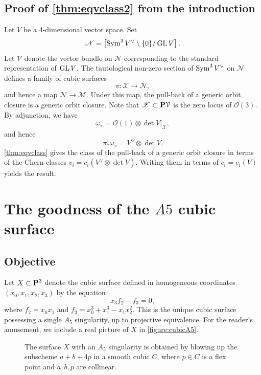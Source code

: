 \documentclass[12pt,reqno]{amsart}
\renewcommand{\to}{{\longrightarrow}}
\numberwithin{equation}{section}
\renewcommand{\O}{\mathcal O}
\begin{document}
\subsection{Proof of \texorpdfstring{\autoref{thm:eqvclass2}}{second theorem} from the introduction}\label{proof:eqvclass2}
Let $V$ be a 4-dimensional vector space.
Set
\[\mathscr N = \left[ \Sym^3V^\vee \setminus \{0\} / \GL V \right]. \]
Let $\mathcal V$ denote the vector bundle on $\mathscr N$ corresponding to the standard representation of $\GL V$.
The tautological non-zero section of $\Sym^3V^\vee$ on $\mathscr N$ defines a family of cubic surfaces
\[ \pi \colon \mathscr X \to \mathscr N,\]
and hence a map $\mathscr N \to \mathscr M$.
Under this map, the pull-back of a generic orbit closure is a generic orbit closure.
Note that $\mathscr X \subset \P \mathcal V$ is the zero locus of $\O(3)$.
By adjunction, we have
\[ \omega_\pi = \O(1) \otimes \det V |_{\mathscr X},\]
and hence
\[ \pi_* \omega_\pi = V^\vee \otimes \det V.\]
\autoref{thm:eqvclass} gives the class of the pull-back of a generic orbit closure in terms of the Chern classes $v_i = c_i(V^\vee \otimes \det V)$.
Writing them in terms of $c_i = c_i(V)$ yields the result.

\appendix



\section{The goodness of the $A5$ cubic surface}
\label{sec:goodnessA5}

\subsection{Objective}
Let $X \subset \P^{3}$ denote the cubic surface defined in homogeneous
coordinates $\left(x_{0}, x_{1}, x_{2}, x_{3}\right)$ by the equation
\[x_{3}f_{2} - f_{3} = 0,\] where $f_{2} = x_{0}x_{1}$ and
$f_{3} = x_{0}^3 + x_{1}^{3}-x_{1}x_{2}^{2}$.  This is the unique
cubic surface possessing a single $A_5$ singularity, up to projective
equivalence.  For the reader's amusement, we include a real picture of
$X$ in \autoref{figure:cubicA5}.

\begin{figure}
  \centering
  
  \caption{The surface $X$ with an $A_5$ singularity is obtained by blowing up the subscheme $a+b+4p$ in a smooth cubic $C$, where $p \in C$ is a flex point and $a, b, p$ are collinear.}
\end{figure}
\end{document}
